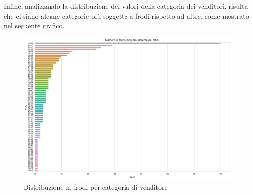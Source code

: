 \documentclass[]{article}
\begin{document}
        Infine, analizzando la distribuzione dei valori della categoria dei venditori, risulta che ci siano alcune categorie più soggette a frodi rispetto ad altre, come mostrato nel seguente grafico.
       \begin{figure}[H]
            \centering
            \includegraphics[width=.6\textwidth]{img/DistribuzioneMCC.png}
            \caption[short]{Distribuzione n. frodi per categoria di venditore}
        \end{figure}
\end{document}
